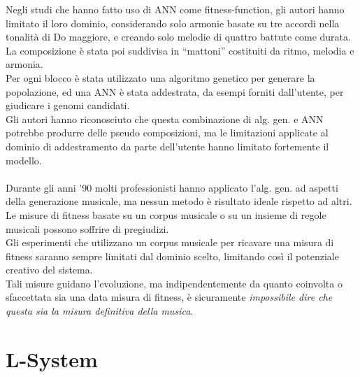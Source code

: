 \documentclass[a4paper,12pt]{report}
\begin{document}
Negli studi che hanno fatto uso di ANN come fitness-function, gli autori hanno limitato il loro dominio, considerando solo armonie basate su tre accordi nella tonalità di Do maggiore, e creando solo melodie di quattro battute come durata. \\
La composizione è stata poi suddivisa in “mattoni” costituiti da ritmo, melodia e armonia. \\
Per ogni blocco è stata utilizzato una algoritmo genetico per generare la popolazione, ed una ANN è stata addestrata, da esempi forniti dall'utente, per giudicare i genomi candidati. \\
Gli autori hanno riconosciuto che questa combinazione di alg. gen. e ANN potrebbe produrre delle pseudo composizioni, 
ma le limitazioni applicate al dominio di addestramento da parte dell'utente hanno limitato fortemente il modello. \\
\\
Durante gli anni ’90 molti professionisti hanno applicato l'alg. gen. ad aspetti della generazione musicale, ma nessun metodo è risultato ideale rispetto ad altri. \\
Le misure di fitness basate su un corpus musicale o su un insieme di regole musicali possono soffrire di pregiudizi. \\
Gli esperimenti che utilizzano un corpus musicale per ricavare una misura di fitness saranno sempre limitati dal dominio scelto, limitando così il potenziale creativo del sistema. \\
Tali misure guidano l’evoluzione, ma indipendentemente da quanto coinvolta o sfaccettata sia una data misura di fitness, è sicuramente \textit{impossibile dire che questa sia la misura definitiva della musica}. \\

\section{L-System}
\end{document}
